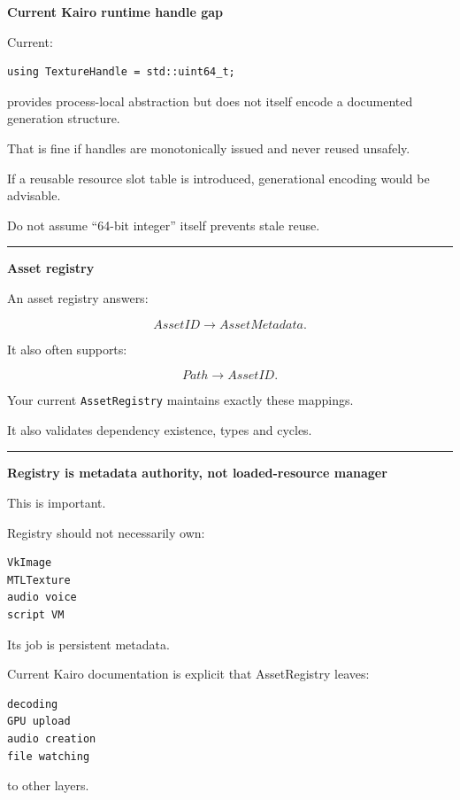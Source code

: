 \textbf{Current Kairo runtime handle gap}

Current:

\begin{verbatim}
using TextureHandle = std::uint64_t;
\end{verbatim}

provides process-local abstraction but does not itself encode a documented generation structure.

That is fine if handles are monotonically issued and never reused unsafely.

If a reusable resource slot table is introduced, generational encoding would be advisable.

Do not assume ``64-bit integer'' itself prevents stale reuse.

\begin{center}\rule{0.5\linewidth}{0.5pt}\end{center}

\textbf{Asset registry}

An asset registry answers:

\[
AssetID\rightarrow AssetMetadata.
\]

It also often supports:

\[
Path\rightarrow AssetID.
\]

Your current \texttt{AssetRegistry} maintains exactly these mappings.

It also validates dependency existence, types and cycles.

\begin{center}\rule{0.5\linewidth}{0.5pt}\end{center}

\textbf{Registry is metadata authority, not loaded-resource manager}

This is important.

Registry should not necessarily own:

\begin{verbatim}
VkImage
MTLTexture
audio voice
script VM
\end{verbatim}

Its job is persistent metadata.

Current Kairo documentation is explicit that AssetRegistry leaves:

\begin{verbatim}
decoding
GPU upload
audio creation
file watching
\end{verbatim}

to other layers.


